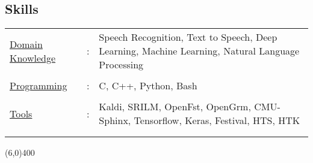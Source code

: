 \documentclass[line,margin]{res}
\begin{document}
\begin{resume}
\section{Skills}
\small
   \begin{tabular}{l c p{3in}}\vspace{-4mm}
   \hspace{-3mm} \underline{Domain Knowledge} & :&   Speech Recognition, Text to Speech, Deep Learning, Machine Learning, Natural Language Processing \\ \\ \vspace{-4mm}
   \hspace{-3mm} \underline{Programming} & :&   C, C++, Python, Bash \\ \\ \vspace{-4mm}
   \hspace{-3mm} \underline{Tools} & :&   Kaldi, SRILM, OpenFst, OpenGrm, CMU-Sphinx, Tensorflow, Keras, Festival, HTS, HTK \\ \\ \vspace{-4mm}
 \end{tabular}
\normalsize

\line(6,0){400}

\normalsize

\end{resume}
\end{document}

